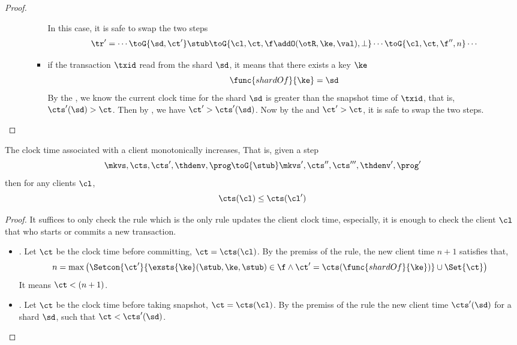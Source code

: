 \begin{proof}
\begin{itemize}
\begin{itemize}
\begin{itemize}
\[                \]
            In this case, it is safe to swap the two steps
            \[
            \begin{array}{@{}l@{}}
            \tr' = \cdots \toG{\sd, \ct'} \stub \toG{\cl,\ct,\f \addO (\otR, \ke, \val),\perp} \cdots \toG{\cl,\ct,\f'',n} \cdots \\
            \end{array}
            \]
            \item if the transaction \( \txid \) read from the shard \( \sd \), it means that there exists a key \( \ke \)
            \[
                \func{shardOf}{\ke} = \sd
            \]
            By the , we know the current clock time for the shard \( \sd \) is greater than the snapshot time of \( \txid \), 
            that is, \( \cts'(\sd) > \ct \).
            Then by ,  we have \( \ct' > \cts'(\sd) \).
            Now by the  and \( \ct' > \ct \), it is safe to swap the two steps.
        \end{itemize}
    \end{itemize}
    \end{itemize}
\end{proof}


\begin{lemma}
    \label{lem:mono-client-clock-time}
    The clock time associated with a client monotonically increases,
    That is, given a step
    \[
        \mkvs, \cts, \cts', \thdenv, \prog \toG{\stub} \mkvs', \cts'', \cts''', \thdenv', \prog'
    \]
    then for any clients \( \cl \),
    \[
        \cts(\cl) \leq \cts(\cl')
    \]
\end{lemma}
\begin{proof}
    It suffices to only check the  rule which is the only rule updates the client clock time,
    especially, it is enough to check the client \( \cl \) that who starts or commits a new transaction.
    \begin{itemize}
        \item {}.
            Let \( \ct \) be the clock time before committing, \( \ct = \cts(\cl)\).
            By the premiss of the rule, the new client time \( n + 1 \) satisfies that, 
            \[
                n = \max\left( \Setcon{\ct'}{\exsts{\ke} (\stub, \ke, \stub) \in \f \land \ct' = \cts(\func{shardOf}{\ke})} \cup \Set{\ct} \right)
            \]
            It means \( \ct < (n + 1)\).
        \item {}.
            Let \( \ct \) be the clock time before taking snapshot, \( \ct = \cts(\cl)\).
            By the premiss of the rule the new  client time \( \cts'(\sd) \) for a shard \( \sd \), 
            such that \( \ct < \cts'(\sd)  \).
    \end{itemize}
\end{proof}

